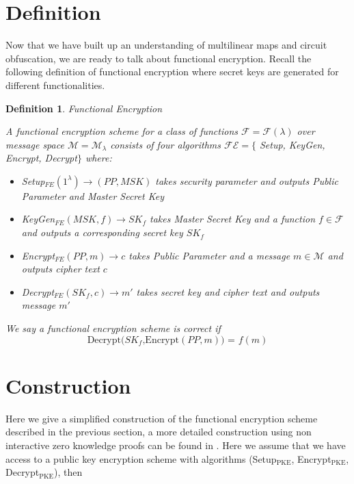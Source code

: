 \documentclass[12pt,twoside]{reedthesis}
\newtheorem{definition}{Definition}
\begin{document}
    \section{Definition}
    Now that we have built up an understanding of multilinear maps and circuit obfuscation, we are ready to talk about functional encryption. Recall the following definition of functional encryption where secret keys are generated for different functionalities.
    \begin{definition}{Functional Encryption}
    \par A functional encryption scheme for a class of functions $\mathcal{F} = \mathcal{F}(\lambda)$ over message space $\mathcal{M} = \mathcal{M}_\lambda$ consists of four algorithms $\mathcal{FE} = \{$ Setup, KeyGen, Encrypt, Decrypt$\}$ where:
    \begin{itemize}
    \item Setup$_{FE}(1^\lambda) \to (PP, MSK)$ takes security parameter and outputs Public Parameter and Master Secret Key 
    \item KeyGen$_{FE}(MSK,f)\to SK_f$ takes Master Secret Key and a function $f\in \mathcal{F}$ and outputs a corresponding secret key $SK_f$
    \item Encrypt$_{FE}(PP,m) \to c$ takes Public Parameter and a message $m\in\mathcal{M}$ and outputs cipher text $c$
    \item Decrypt$_{FE}(SK_f,c)\to m'$ takes secret key and cipher text and outputs message $m'$
    \end{itemize}
    \par We say a functional encryption scheme is correct if $$\text{Decrypt$(SK_f$,Encrypt$(PP,m))$ = $f(m)$}$$
    \end{definition}
    
    \section{Construction}
    Here we give a simplified construction of the functional encryption scheme described in the previous section, a more detailed construction using non interactive zero knowledge proofs can be found in \cite{Garg:2013}. Here we assume that we have access to a public key encryption scheme with algorithms (Setup$_{\text{PKE}}$, Encrypt$_{\text{PKE}}$, Decrypt$_{\text{PKE}}$), then
    
\end{document}
